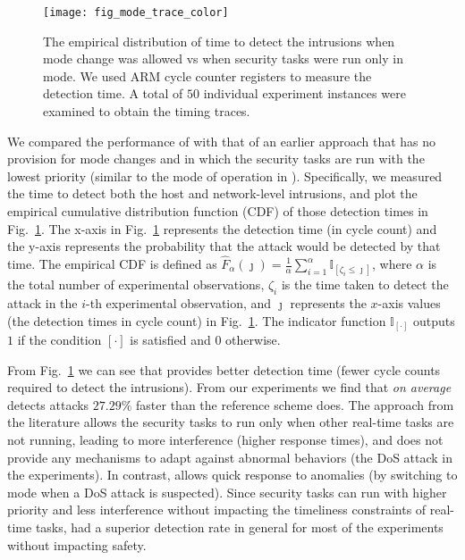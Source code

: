 \documentclass[../rt_server_main.tex]{subfiles}
\begin{document}
   \begin{figure}[!t]
\centering
\texttt{[image: fig\_mode\_trace\_color]}
\caption{The empirical distribution of time to detect the intrusions when mode change was allowed vs when security tasks were run only in \pve mode. We used ARM cycle counter registers to measure the detection time. A total of $50$ individual experiment instances were examined to obtain the timing traces.}
\label{fig:mode_trace}
\vspace{-1.0\baselineskip}
 \end{figure}

We compared the performance of \coolname with that of an earlier approach \cite{mhasan_rtss16} that has no provision for mode changes and in which the security tasks are run with the lowest priority (similar to the \pve mode of operation in \coolname). Specifically, we measured the time to detect both the host and network-level intrusions, and plot the empirical cumulative distribution function (CDF) of those detection times in Fig.~\ref{fig:mode_trace}. The x-axis in  Fig.~\ref{fig:mode_trace} represents the detection time (in cycle count) and the y-axis represents the probability that the attack would be detected by that time.  The empirical CDF is defined as $\widehat{F}_\alpha(\jmath) = \frac{1}{\alpha} \displaystyle \sum_{i=1}^\alpha \mathbb{I}_{[\zeta_i \leq \jmath]}$, where $\alpha$ is the total number of experimental observations, ${\zeta}_i$ is the time taken to detect the attack in the $i$-th experimental observation, and $\jmath$  represents the $x$-axis values (\viz the detection times in cycle count) in Fig.~\ref{fig:mode_trace}. The indicator function $\mathbb{I}_{[\cdot]}$ outputs $1$ if the condition $[\cdot]$ is satisfied and $0$ otherwise.



From Fig.~\ref{fig:mode_trace} we can see that \coolname provides better detection time (\ie fewer cycle counts required to detect the intrusions). From our experiments we find that \textit{on average} \coolname detects attacks $27.29\%$ faster than the reference scheme does. The approach from the literature \cite{mhasan_rtss16} allows the security tasks to run only when other real-time tasks are not running, leading to more interference (\eg higher response times), and does not provide any mechanisms to adapt against abnormal behaviors (\eg the DoS attack in the experiments). In contrast, \coolname allows quick response to anomalies (by switching to \ave mode when a DoS attack is suspected). Since \ave security tasks can run with higher priority and less interference without impacting the timeliness constraints of real-time tasks, \coolname had a superior detection rate in general for most of the experiments  without impacting safety. 

 
\end{document}
